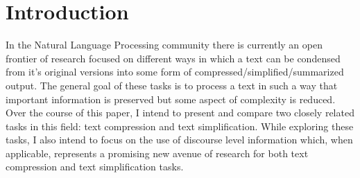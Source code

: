 \section{Introduction}



{In the Natural Language Processing community there is currently an open frontier of research focused on different ways in which a text can be condensed from it's original versions into some form of compressed/simplified/summarized output. The general goal of these tasks is to process a text in such a way that important information is preserved but some aspect of complexity is reduced.  Over the course of this paper, I intend to present and compare two closely related tasks in this field: text compression and  text simplification. While exploring these tasks, I also intend to focus on the use of discourse level information which, when applicable, represents a promising new avenue of research for both text compression and text simplification tasks.}

